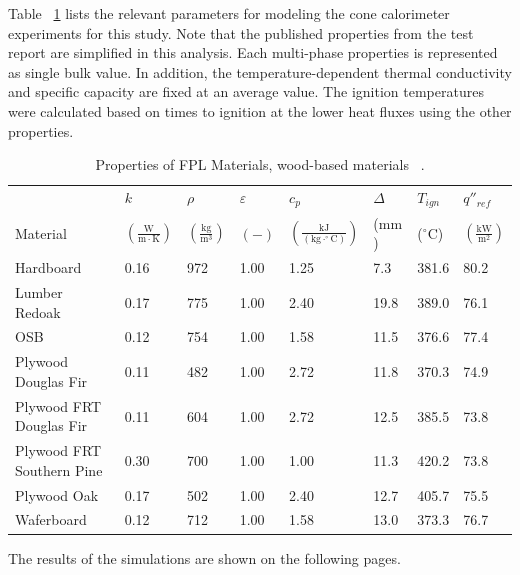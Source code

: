 Table ~\ref{Properties_FPL_Wood_Materials_woods} lists the relevant parameters for modeling the cone calorimeter experiments for this study.
Note that the published properties from the test report are simplified in this analysis. Each multi-phase properties is represented as single bulk value.
In addition, the temperature-dependent thermal conductivity and specific capacity are fixed at an average value.
The ignition temperatures were calculated based on times to ignition at the lower heat fluxes using the other properties.

\begin{table}[!h]
\caption[Properties of FPL Materials, wood-based materials]{Properties of FPL Materials, wood-based materials ~\cite{FPL:Fire_Database}.}
\centering
\begin{tabular}{|p{5.5cm}|p{1.0cm}|p{1.0cm}|p{0.8cm}|p{1.4cm}|p{1.0cm}|p{1.0cm}|p{1.2cm}|}
\hline
                                               & $k$    & $\rho$      & $\varepsilon$   & $c_{p}$ & $\Delta$    & $T_{ign}$ & $q''_{ref}$ \\
Material                                       & $\mathrm{\left(\frac{W}{m\cdot K}\right)}$ & $\mathrm{\left(\frac{kg}{m^{3}}\right)}$ & $\mathrm{( - )}$ & $\mathrm{\left(\frac{kJ}{(kg\cdot ^{\circ}C)}\right)}$ &  ($\mathrm{mm}$)   & ($\mathrm{^{\circ}C}$) & $\mathrm{\left(\frac{kW}{m^{2}}\right)}$ \\ \hline
\hline
Hardboard  & 0.16 & 972 & 1.00 & 1.25 & 7.3 & 381.6 & 80.2 \\ \hline
Lumber Redoak  & 0.17 & 775 & 1.00 & 2.40 & 19.8 & 389.0 & 76.1 \\ \hline
OSB  & 0.12 & 754 & 1.00 & 1.58 & 11.5 & 376.6 & 77.4 \\ \hline
Plywood Douglas Fir  & 0.11 & 482 & 1.00 & 2.72 & 11.8 & 370.3 & 74.9 \\ \hline
Plywood FRT Douglas Fir  & 0.11 & 604 & 1.00 & 2.72 & 12.5 & 385.5 & 73.8 \\ \hline
Plywood FRT Southern Pine  & 0.30 & 700 & 1.00 & 1.00 & 11.3 & 420.2 & 73.8 \\ \hline
Plywood Oak  & 0.17 & 502 & 1.00 & 2.40 & 12.7 & 405.7 & 75.5 \\ \hline
Waferboard  & 0.12 & 712 & 1.00 & 1.58 & 13.0 & 373.3 & 76.7 \\ \hline
\end{tabular}
\label{Properties_FPL_Wood_Materials_woods}
\end{table}

The results of the simulations are shown on the following pages.

